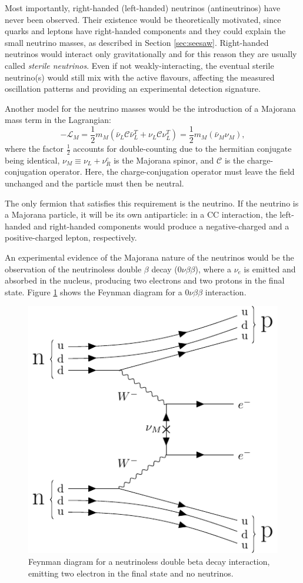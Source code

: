Most importantly, right-handed (left-handed) neutrinos (antineutrinos) have never been observed. Their existence would be theoretically motivated, since quarks and leptons have right-handed components and they could explain the small neutrino masses, as described in Section \ref{sec:seesaw}. Right-handed neutrinos would interact only gravitationally and for this reason they are usually called \emph{sterile neutrinos}. Even if not weakly-interacting, the eventual sterile neutrino(s) would still mix with the active flavours, affecting the measured oscillation patterns and providing an experimental detection signature.

Another model for the neutrino masses would be the introduction of a Majorana mass term in the Lagrangian:
\begin{equation}
    -\mathcal{L}_M = \frac{1}{2}m_M(\bar{\nu}_L\mathcal{C}\bar{\nu}^{T}_L+\nu_{L}\mathcal{C}\nu^T_L) = \frac{1}{2}m_M(\bar{\nu}_M\nu_M), \label{eq:majorana}
\end{equation}
where the factor $\frac{1}{2}$ accounts for double-counting due to the hermitian conjugate being identical, $\nu_{M} \equiv \nu_L + \nu^c_R$ is the Majorana spinor, and $\mathcal{C}$ is the charge-conjugation operator. Here, the charge-conjugation operator must leave the field unchanged and the particle must then be neutral.

The only fermion that satisfies this requirement is the neutrino. If the neutrino is a Majorana particle, it will be its own antiparticle: in a CC interaction, the left-handed and right-handed components would produce a negative-charged and a positive-charged lepton, respectively.

An experimental evidence of the Majorana nature of the neutrinos would be the observation of the neutrinoless double $\beta$ decay ($0\nu\beta\beta$), where a $\nu_{e}$ is emitted and absorbed in the nucleus, producing two electrons and two protons in the final state. Figure \ref{fig:0vbb} shows the Feynman diagram for a $0\nu\beta\beta$ interaction. 

\begin{figure}[htbp]
    \centering
    \includegraphics[width=0.55\linewidth]{figures/0vbb.pdf}
    \caption{Feynman diagram for a neutrinoless double beta decay interaction, emitting two electron in the final state and no neutrinos.}
    \label{fig:0vbb}
\end{figure}

